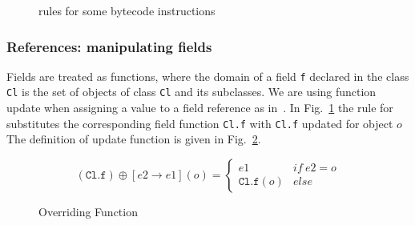 \begin{figure}[ht]
\caption{rules for some bytecode instructions}
\label{instrWP}
\end{figure}

\subsubsection{References: manipulating fields}
Fields are treated as functions, where the domain of a field \texttt{f} 
declared in the class \texttt{Cl} is the set of objects of class \texttt{Cl} and its subclasses.
We are using function update when assigning a value to a field reference as in~\cite{B00ppp}. 
In Fig.~\ref{instrWP} the rule for  substitutes the corresponding field function \texttt{Cl.f} with \texttt{Cl.f} updated for object $o$ 
The definition of update function is given in Fig.~\ref{override}.

\begin{figure}
$$
 (\texttt{Cl.f})\oplus[e2 \rightarrow e1](o) = \left\{ \begin{array} {ll}
						       e1 & if \ e2 = o \\
					               \texttt{Cl.f}(o)	& else 
	\end{array}\right. 
$$ 
\caption{Overriding Function}
\label{override}
\end{figure}



